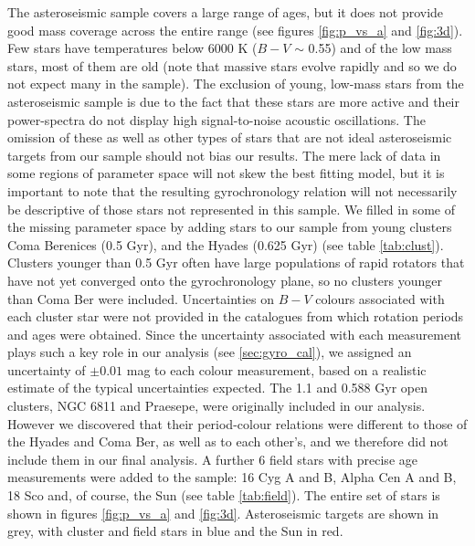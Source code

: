 The asteroseismic sample covers a large range of ages, but it does not provide
good mass coverage across the entire range (see figures \ref{fig:p_vs_a} and
\ref{fig:3d}).
Few stars have temperatures below 6000 K ($B-V$ $\sim$ 0.55) and of the low
mass stars, most of them are old (note that massive stars evolve rapidly and
so we do not expect many in the sample).
The exclusion of young, low-mass stars from the asteroseismic sample is due to
the fact that these stars are more active and their power-spectra do not
display high signal-to-noise acoustic oscillations.
The omission of these as well as other types of stars that are not ideal
asteroseismic targets from our sample should not bias our results.
The mere lack of data in some regions of parameter space will not skew the
best fitting model, but it is important to note that the resulting
gyrochronology relation will not necessarily be descriptive of those stars not
represented in this sample.  %
We filled in some of the missing parameter space by adding \nHC stars to our
sample from young clusters Coma Berenices (0.5 Gyr), and the Hyades
(0.625 Gyr) (see table \ref{tab:clust}).
Clusters younger than 0.5 Gyr often have large populations of rapid rotators
that have not yet converged onto the gyrochronology plane, so no clusters
younger than Coma Ber were included.
Uncertainties on $B-V$ colours associated with each cluster star were not
provided in the catalogues from which rotation periods and ages were obtained.
Since the uncertainty associated with each measurement plays such a key role
in our analysis (see \textsection \ref{sec:gyro_cal}), we assigned an
uncertainty of
$\pm 0.01$ %
mag to each colour measurement, based on a realistic estimate of the
typical uncertainties expected.
The 1.1 and 0.588 Gyr open clusters, NGC 6811 \citep{Meibom2011} and Praesepe,
\citep{Delorme2011, Delorme2011_cat} were originally included in our analysis.
However we discovered that their period-colour relations were different to
those of the Hyades and Coma Ber, as well as to each other's, and we therefore
did not include them in our final analysis.
A further 6 field stars with precise age measurements were added to the
sample: 16 Cyg A and B, Alpha Cen A and B, 18 Sco and, of course, the Sun
(see table \ref{tab:field}).
The entire set of \ntotal stars is shown in figures \ref{fig:p_vs_a} and
\ref{fig:3d}.
Asteroseismic targets are shown in grey, with cluster and field stars in blue
and the Sun in red.

